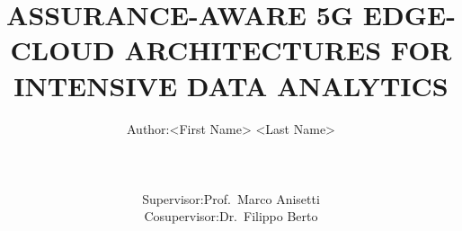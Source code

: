 \documentclass{scrbook}
\theoremstyle{definition}
\begin{document}
\subject{
	\uppercase{\huge Università degli Studi di Milano} \\
	\uppercase{\large Facoltà di scienze e tecnologie}
	\vspace{1em}\\
	\uppercase{\large Dipartimento di Informatica }\\
	\uppercase{\large ``Giovanni Degli Antoni''}
	\vspace{1em}\\
	\texttt{[image: images/unimi.pdf]}
	\vspace{1em}\\
	\uppercase{\large Laurea Magistrale in} \\
	\uppercase{\large Informatica} \\
}
\title{\LARGE\uppercase{Assurance-aware 5G Edge-Cloud Architectures for \\ Intensive data analytics}}
\author{
	\begin{tabular}{@{}r@{}rr@{}}
		\hspace{10em} & Author: & <First Name> <Last Name>
	\end{tabular}
	\\\\\vspace{1em}
	\begin{tabular}{@{}ll@{}r@{}}
		Supervisor:   & Prof.~Marco Anisetti & \hspace{10em} \\
		Cosupervisor: & Dr.~Filippo Berto    &               \\
	\end{tabular}
}
\date{}

\frontmatter
\maketitle





\tableofcontents
\listoffigures
\listoftables

\mainmatter{}








% 

\backmatter{}
\printglossary[
	type=acronym,
	style=mcolindex,
	nonumberlist
]



\end{document}
